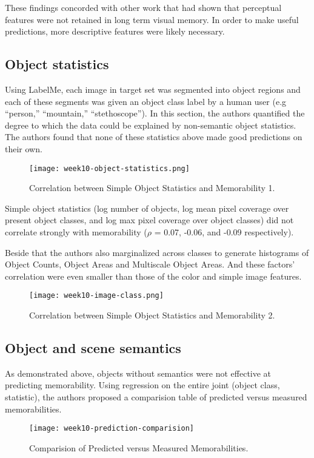 These findings concorded with other work that had shown that perceptual features were not retained in long term visual memory\cite{simplefeatures}. In order to make useful predictions, more descriptive features were likely necessary.

\subsection{Object statistics}
Using LabelMe\cite{labelme}, each image in target set was segmented into object regions and each of these segments was given an object class label by a human user (e.g “person,” “mountain,” “stethoscope”). In this section, the authors quantified the degree to which the data could be explained by non-semantic object statistics. The authors found that none of these statistics above made good predictions on their own. 

\begin{figure}[!ht]
\centering
\texttt{[image: week10-object-statistics.png]}
\caption{Correlation between Simple Object Statistics and Memorability 1.}
\end{figure}
    
Simple object statistics (log number of objects, log mean pixel coverage over present object classes, and log max pixel coverage over object classes) did not correlate strongly with memorability ($\rho$ = 0.07, -0.06, and -0.09 respectively).

Beside that the authors also marginalized across classes to generate histograms of Object Counts, Object Areas and Multiscale Object Areas. And these factors' correlation were even smaller than those of the color and simple image features.

\begin{figure}[!ht]
\centering
\texttt{[image: week10-image-class.png]}
\caption{Correlation between Simple Object Statistics and Memorability 2.}
\end{figure}

\subsection{Object and scene semantics}
As demonstrated above, objects without semantics were not effective at predicting memorability. Using regression on the entire joint (object class, statistic), the authors proposed a comparision table of predicted versus measured memorabilities.

\begin{figure}[!ht]
\centering
\texttt{[image: week10-prediction-comparision]}
\caption{Comparision of Predicted versus Measured Memorabilities.}
\end{figure}

